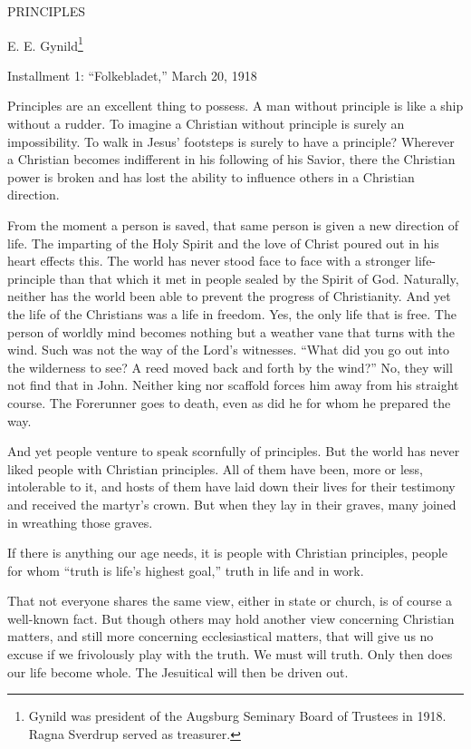 
PRINCIPLES

E. E. Gynild\footnote{Gynild was president of the Augsburg Seminary Board of Trustees in 1918. Ragna Sverdrup served as treasurer.}


Installment 1: “Folkebladet,” March 20, 1918

Principles are an excellent thing to possess. A man without principle is like a ship without a rudder. To imagine a Christian without principle is surely an impossibility. To walk in Jesus’ footsteps is surely to have a principle? Wherever a Christian becomes indifferent in his following of his Savior, there the Christian power is broken and has lost the ability to influence others in a Christian direction.

From the moment a person is saved, that same person is given a new direction of life. The imparting of the Holy Spirit and the love of Christ poured out in his heart effects this. The world has never stood face to face with a stronger life-principle than that which it met in people sealed by the Spirit of God. Naturally, neither has the world been able to prevent the progress of Christianity. And yet the life of the Christians was a life in freedom. Yes, the only life that is free. The person of worldly mind becomes nothing but a weather vane that turns with the wind. Such was not the way of the Lord’s witnesses. “What did you go out into the wilderness to see? A reed moved back and forth by the wind?” No, they will not find that in John. Neither king nor scaffold forces him away from his straight course. The Forerunner goes to death, even as did he for whom he prepared the way.

And yet people venture to speak scornfully of principles. But the world has never liked people with Christian principles. All of them have been, more or less, intolerable to it, and hosts of them have laid down their lives for their testimony and received the martyr’s crown. But when they lay in their graves, many joined in wreathing those graves.

If there is anything our age needs, it is people with Christian principles, people for whom “truth is life’s highest goal,” truth in life and in work.

That not everyone shares the same view, either in state or church, is of course a well-known fact. But though others may hold another view concerning Christian matters, and still more concerning ecclesiastical matters, that will give us no excuse if we frivolously play with the truth. We must will truth. Only then does our life become whole. The Jesuitical will then be driven out.

